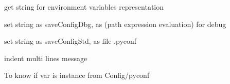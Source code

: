 \documentclass[a4paper,10pt,english]{sphinxmanual}
\begin{document}

\begin{fulllineitems}
\label{\detokenize{commands/apidoc/src:src.debug.getLocalEnv}}
get string for environment variables representation

\end{fulllineitems}


\begin{fulllineitems}
\label{\detokenize{commands/apidoc/src:src.debug.getStrConfigDbg}}
set string as saveConfigDbg, 
as (path expression evaluation) for debug

\end{fulllineitems}


\begin{fulllineitems}
\label{\detokenize{commands/apidoc/src:src.debug.getStrConfigStd}}
set string as saveConfigStd, as file .pyconf

\end{fulllineitems}


\begin{fulllineitems}
\label{\detokenize{commands/apidoc/src:src.debug.indent}}
indent multi lines message

\end{fulllineitems}


\begin{fulllineitems}
\label{\detokenize{commands/apidoc/src:src.debug.isTypeConfig}}
To know if var is instance from Config/pyconf

\end{fulllineitems}
\end{document}
